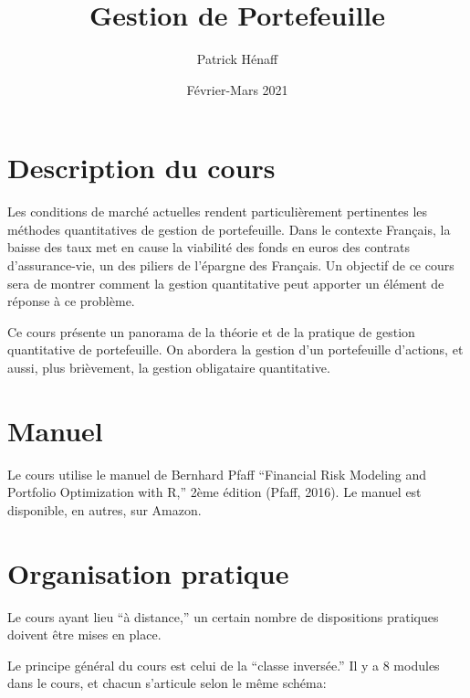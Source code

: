 \documentclass[
  11pt,
]{article}
\title{Gestion de Portefeuille}
\author{Patrick Hénaff}
\date{Février-Mars 2021}
\begin{document}
\maketitle

\hypertarget{description-du-cours}{%
\section{Description du cours}\label{description-du-cours}}

Les conditions de marché actuelles rendent particulièrement pertinentes
les méthodes quantitatives de gestion de portefeuille. Dans le contexte
Français, la baisse des taux met en cause la viabilité des fonds en
euros des contrats d'assurance-vie, un des piliers de l'épargne des
Français. Un objectif de ce cours sera de montrer comment la gestion
quantitative peut apporter un élément de réponse à ce problème.

Ce cours présente un panorama de la théorie et de la pratique de gestion
quantitative de portefeuille. On abordera la gestion d'un portefeuille
d'actions, et aussi, plus brièvement, la gestion obligataire
quantitative.

\hypertarget{manuel}{%
\section{Manuel}\label{manuel}}

Le cours utilise le manuel de Bernhard Pfaff ``Financial Risk Modeling
and Portfolio Optimization with R,'' 2ème édition (Pfaff, 2016). Le
manuel est disponible, en autres, sur Amazon.

\hypertarget{organisation-pratique}{%
\section{Organisation pratique}\label{organisation-pratique}}

Le cours ayant lieu ``à distance,'' un certain nombre de dispositions
pratiques doivent être mises en place.

Le principe général du cours est celui de la ``classe inversée.'' Il y a
8 modules dans le cours, et chacun s'articule selon le même schéma:
\end{document}
